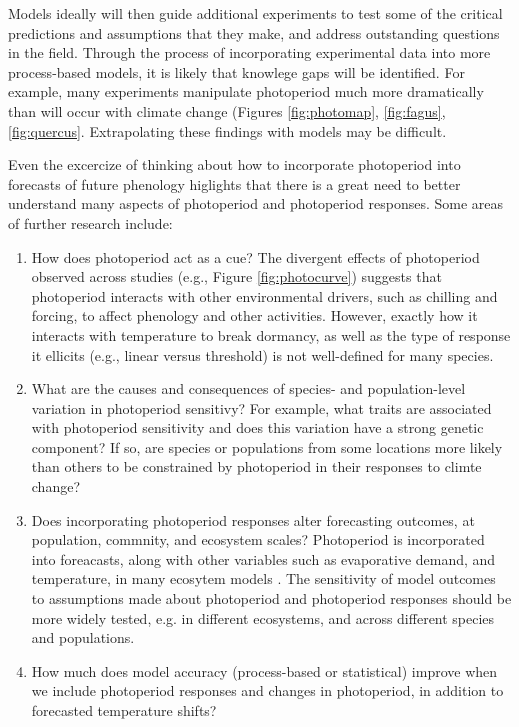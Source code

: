 \documentclass{article}
\begin{document}
\par Models ideally will then guide additional experiments to test some of the critical predictions and assumptions that they make, and address outstanding questions in the field. Through the process of incorporating experimental data into more process-based models, it is likely that knowlege gaps will be identified. For example, many experiments manipulate photoperiod much more dramatically than will occur with climate change (Figures \ref{fig:photomap}, \ref{fig:fagus},\ref{fig:quercus}. Extrapolating these findings with models may be difficult. 
\par Even the excercize of thinking about how to incorporate photoperiod into forecasts of future phenology higlights that there is a great need to better understand many aspects of photoperiod and photoperiod responses. Some areas of further research include:
\begin{enumerate}
\item How does photoperiod act as a cue? The divergent effects of photoperiod observed across studies (e.g., Figure \ref{fig:photocurve}) suggests that photoperiod interacts with other environmental drivers, such as chilling and forcing, to affect phenology and other activities. However, exactly how it interacts with temperature to break dormancy, as well as the type of response it ellicits (e.g., linear versus threshold) is not well-defined for many species.  
\item What are the causes and consequences of species- and population-level variation in photoperiod sensitivy? For example, what traits are associated with photoperiod sensitivity and does this variation have a strong genetic component? If so, are species or populations from some locations more likely than others to be constrained by photoperiod in their responses to climte change?

\item Does incorporating photoperiod responses alter forecasting outcomes, at population, commnity, and ecosystem scales?  Photoperiod is incorporated into foreacasts, along with other variables such as evaporative demand, and temperature, in many ecosytem models \citep [e.g. ED] []{jolly2005, medvigy2013}. The sensitivity of model outcomes to assumptions made about photoperiod and photoperiod responses should be more widely tested, e.g. in different ecosystems, and across different species and populations.
\item How much does model accuracy (process-based or statistical) improve when we include photoperiod responses and changes in photoperiod, in addition to forecasted temperature shifts?  
\end{enumerate}
\end{document}
